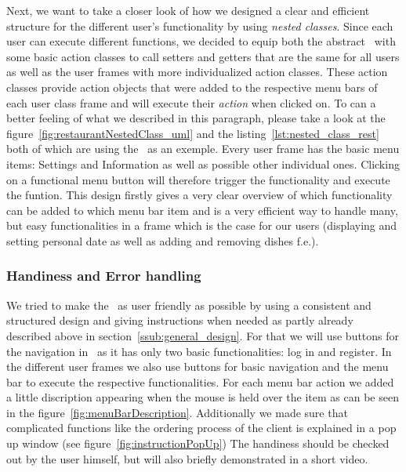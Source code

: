 Next, we want to take a closer look of how we designed a clear and efficient structure for the 
different user's functionality by using \emph{nested classes}. Since each user can execute 
different functions, we decided to equip both the abstract \UserF~with some basic action classes to 
call setters and getters that are the same for all users as well as the user frames with more 
individualized action classes. These action classes provide action objects that were added to the 
respective menu bars of each user class frame and will execute their \textit{action} when clicked on. 
To can a better feeling of what we described in this paragraph, please take a look at the 
figure~\ref{fig:restaurantNestedClass_uml} and the listing~\ref{lst:nested_class_rest} both of which 
are using the \RestF~as an exemple. 
Every user frame has the basic menu items: Settings and Information as well as possible other 
individual ones. Clicking on a functional menu button will therefore trigger the functionality and 
execute the funtion. This design firstly gives a very clear overview of which functionality can be 
added to which menu bar item and is a very efficient way to handle many, but easy functionalities in 
a frame which is the case for our users (displaying and setting personal date as well as adding and 
removing dishes f.e.).

\subsubsection{Handiness and Error handling} %
\label{ssub:handling_of_the_gui}

We tried to make the \GUI~as user friendly as possible by using a consistent and structured design 
and giving instructions when needed as partly already described above in 
section~\ref{ssub:general_design}. For that we will use buttons for the navigation in \StFra~as it 
has only two basic functionalities: log in and register. In the different user frames we also use 
buttons for basic navigation and the menu bar to execute the respective functionalities. 
For each menu bar action we added a little discription appearing when the mouse is held over the item 
as can be seen in the figure~\ref{fig:menuBarDescription}. Additionally we made sure that complicated 
functions like the ordering process of the client is explained in a pop up window (see figure~\ref{fig:instructionPopUp})
The handiness should be checked out by the user himself, but will also briefly demonstrated in a 
short video.


